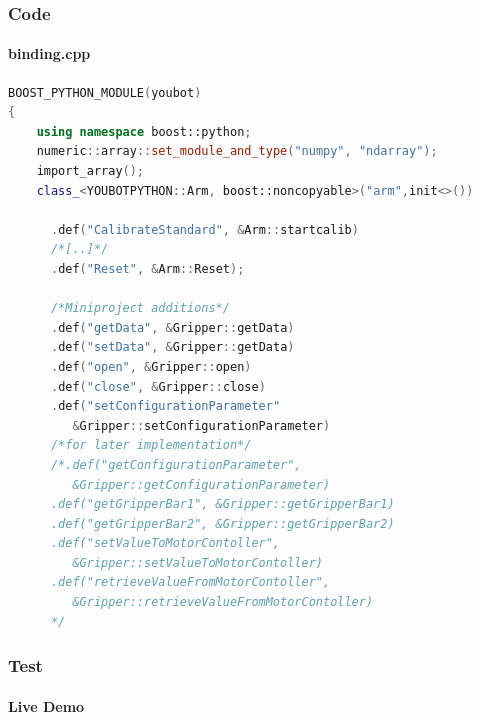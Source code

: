 \documentclass{beamer}
\begin{document}
\begin{frame}[fragile]
 \frametitle{Code}
 \framesubtitle{binding.cpp}
\begin{lstlisting}[language=C++]
BOOST_PYTHON_MODULE(youbot)
{
    using namespace boost::python;
    numeric::array::set_module_and_type("numpy", "ndarray"); 
    import_array();
    class_<YOUBOTPYTHON::Arm, boost::noncopyable>("arm",init<>())

      .def("CalibrateStandard", &Arm::startcalib)
      /*[..]*/
      .def("Reset", &Arm::Reset);

      /*Miniproject additions*/
      .def("getData", &Gripper::getData)
      .def("setData", &Gripper::getData)
      .def("open", &Gripper::open)
      .def("close", &Gripper::close)
      .def("setConfigurationParameter"
         &Gripper::setConfigurationParameter)
      /*for later implementation*/
      /*.def("getConfigurationParameter",
         &Gripper::getConfigurationParameter)
      .def("getGripperBar1", &Gripper::getGripperBar1)
      .def("getGripperBar2", &Gripper::getGripperBar2)
      .def("setValueToMotorContoller",
         &Gripper::setValueToMotorContoller)
      .def("retrieveValueFromMotorContoller",
         &Gripper::retrieveValueFromMotorContoller)
      */
\end{lstlisting} 
\end{frame}

\begin{frame}
 \frametitle{Test}
 \framesubtitle{Live Demo}
\end{frame}


%         


\end{document}
